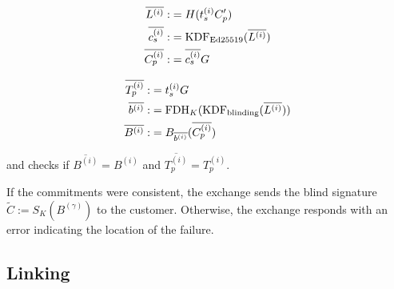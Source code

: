 \documentclass{llncs}
\begin{document}
\begin{enumerate}
    \vspace{-2ex}
    \begin{minipage}{5cm}
    \begin{align*}
      \overline{L^{(i)}} :&= H(t_s^{(i)} C_p') \\
      \overline{c_s^{(i)}} :&= \textrm{KDF}_{\textrm{Ed25519}}(\overline{L^{(i)}}) \\
      \overline{C^{(i)}_p} :&= \overline{c_s^{(i)}} G
     \end{align*}
    \end{minipage}
    \begin{minipage}{5cm}
     \begin{align*}
       \overline{T_p^{(i)}} :&= t_s^{(i)} G \\
       \overline{b^{(i)}} :&= \textrm{FDH}_K(\textrm{KDF}_{\textrm{blinding}}(\overline{L^{(i)}})) \\
       \overline{B^{(i)}} :&= B_{\overline{b^{(i)}}}(\overline{C_p^{(i)}})
     \end{align*}
    \end{minipage}

    and checks if $\overline{B^{(i)}} = B^{(i)}$
    and $\overline{T^{(i)}_p} = T^{(i)}_p$.

    If the commitments were consistent, the exchange sends the
    blind signature $\widetilde{C} := S_{K}(B^{(\gamma)})$ to the customer.
    Otherwise, the exchange responds with an error indicating
     the location of the failure.
\end{enumerate}


%

\subsection{Linking}

\end{document}
